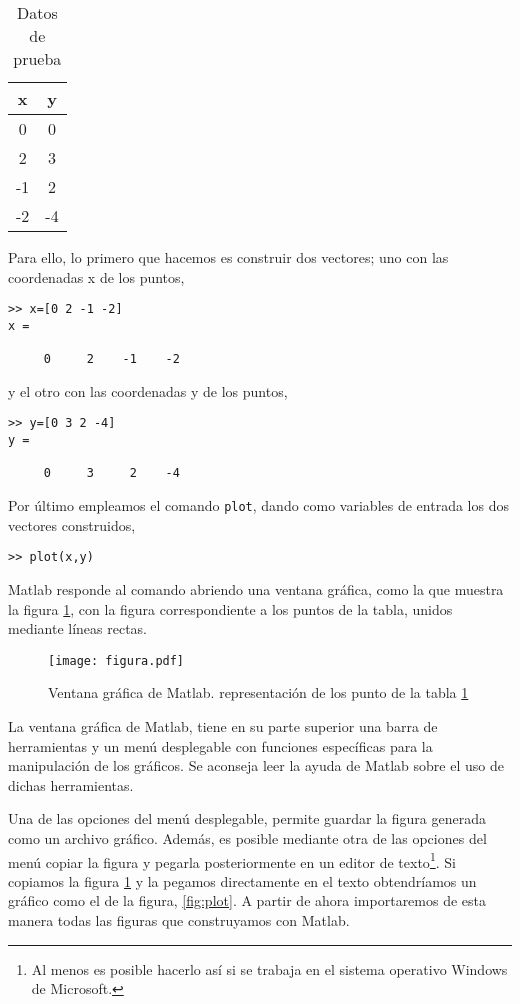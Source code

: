 \begin{table}[h]
\caption{Datos de prueba}
\centering
\begin{tabular}{|c|c|}
x&y\\ 
\hline
0&0\\
2&3\\
-1&2\\
-2&-4\\ 
\end{tabular}
\label{tpuntos}
\end{table} 

Para ello, lo primero que hacemos es construir dos vectores; uno con las coordenadas x de los puntos,
\begin{verbatim}
>> x=[0 2 -1 -2]
x =

     0     2    -1    -2

\end{verbatim}
y el otro con las coordenadas y de los puntos,
\begin{verbatim}
>> y=[0 3 2 -4]
y =

     0     3     2    -4
\end{verbatim}
 
Por último empleamos el comando \texttt{plot}, dando como variables de entrada los dos vectores construidos,
 
\begin{verbatim}
>> plot(x,y)
\end{verbatim}

Matlab responde al comando abriendo una ventana gráfica, como la que muestra la figura \ref{fig:ventana}, con la figura correspondiente a los puntos de la tabla, unidos mediante líneas rectas.

\begin{figure}[h]
\centering
\texttt{[image: figura.pdf]}
\caption{Ventana gráfica de Matlab. representación de los punto de la tabla \ref{tpuntos}}
\label{fig:ventana}
\end{figure}

La ventana gráfica de Matlab, tiene en su parte superior una barra de herramientas y un menú desplegable con funciones específicas para la manipulación de los gráficos. Se aconseja leer la ayuda de Matlab sobre el uso de dichas herramientas.

Una de las opciones del menú desplegable, permite guardar la figura generada como un archivo gráfico. Además, es posible mediante otra de las opciones del menú copiar la figura y pegarla posteriormente en un editor de texto\footnote{Al menos es posible hacerlo así si se trabaja en el sistema operativo Windows de Microsoft.}. Si copiamos la figura \ref{fig:ventana} y la pegamos directamente en el texto obtendríamos un gráfico como el de la figura, \ref{fig:plot}. A partir de ahora importaremos de esta manera todas las figuras que construyamos con Matlab.

